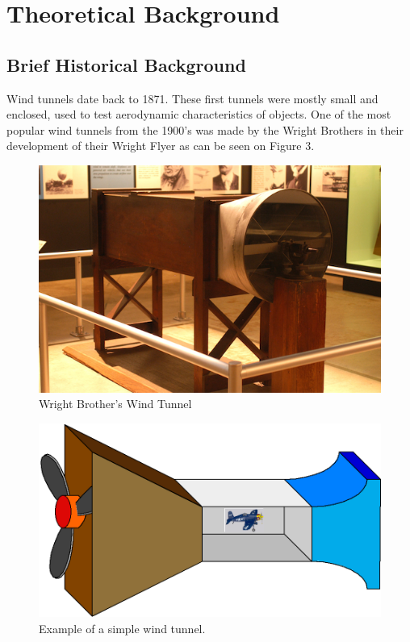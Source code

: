 \section{Theoretical Background}

	\subsection{Brief Historical Background}
	
	Wind tunnels date back to 1871. These first tunnels were mostly small and enclosed, used to test aerodynamic characteristics of objects. One of the most popular wind tunnels from the 1900's was made by the Wright Brothers in their development of their Wright Flyer \cite{ref:wright1} as can be seen on Figure 3.
		
		\begin{figure}[H]
			\centering
				\includegraphics[scale=0.9]{img/wrightBrothersTunnel}
			\caption{Wright Brother's Wind Tunnel \cite{ref:wright2}}
		\end{figure}
		
		\begin{figure}[H]
			\centering
				\includegraphics[scale=0.5]{img/windtunnel2}
			\caption{Example of a simple wind tunnel.}
		\end{figure}
	
